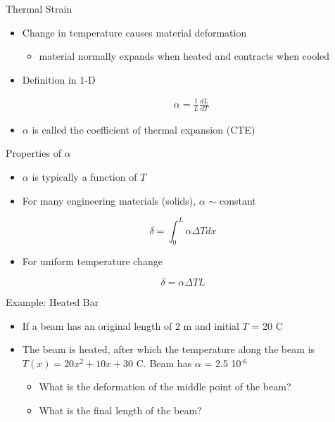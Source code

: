\documentclass[10pt, svgnames]{beamer}
\begin{document}
\begin{frame}[label={sec:org19ab7f8}]{Thermal Strain}
\begin{itemize}
\item Change in temperature causes material deformation

\begin{itemize}
\item material normally expands when heated and contracts when cooled
\end{itemize}

\item Definition in 1-D

\begin{align*}
  \alpha = \frac{1}{L} \frac{d L}{dT}
\end{align*}

\item \(\alpha\) is called the coefficient of thermal expansion (CTE)
\end{itemize}
\end{frame}

\begin{frame}[label={sec:org43175db}]{Properties of \(\alpha\)}
\begin{itemize}
\item \(\alpha\) is typically a function of \(T\)

\item For many engineering materials (solids), \(\alpha\) \(\sim\) constant
\end{itemize}

\[\delta = \int_0^L \alpha \Delta T dx\]

\begin{itemize}
\item For uniform temperature change
\end{itemize}

\[\delta = \alpha \Delta T L\]
\end{frame}

\begin{frame}[label={sec:orgfa53b39}]{Example: Heated Bar}
\begin{itemize}
\item If a beam has an original length of 2 m and initial \(T\) = 20 C

\item The beam is heated, after which the temperature along the beam is
\(T(x) = 20 x^2 + 10x + 30\) C. Beam has \(\alpha\) = 2.5
10\(^{\text{-6}}\)

\begin{itemize}
\item What is the deformation of the middle point of the beam?

\item What is the final length of the beam?
\end{itemize}
\end{itemize}
\end{frame}
\end{document}
